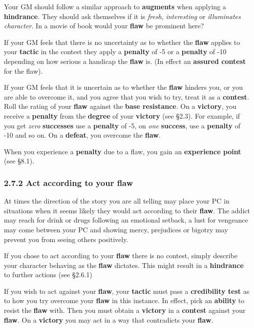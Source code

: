 \documentclass[
  11pt,
]{article}
\begin{document}
Your GM should follow a similar approach to \textbf{augments} when
applying a \textbf{hindrance}. They should ask themselves if it is
\emph{fresh}, \emph{interesting} or \emph{illuminates character}. In a
movie of book would your \textbf{flaw} be prominent here?

If your GM feels that there is no uncertainty as to whether the
\textbf{flaw} applies to your \textbf{tactic} in the contest they apply
a \textbf{penalty} of -5 or a \textbf{penalty} of -10 depending on how
serious a handicap the \textbf{flaw} is. (In effect an \textbf{assured
contest} for the flaw).

If your GM feels that it is uncertain as to whether the \textbf{flaw}
hinders you, or you are able to overcome it, and you agree that you wish
to try, treat it as a \textbf{contest}. Roll the rating of your
\textbf{flaw} against the \textbf{base resistance}. On a
\textbf{victory}, you receive a \textbf{penalty} from the
\textbf{degree} of your \textbf{victory} (see §2.3). For example, if you
get \emph{zero} \textbf{successes} use a \textbf{penalty} of -5, on
\emph{one} \textbf{success}, use a \textbf{penalty} of -10 and so on. On
a \textbf{defeat}, you overcome the \textbf{flaw}.

When you experience a \textbf{penalty} due to a flaw, you gain an
\textbf{experience point} (see §8.1).

\hypertarget{act-according-to-your-flaw}{%
\subsubsection{2.7.2 Act according to your
flaw}\label{act-according-to-your-flaw}}

At times the direction of the story you are all telling may place your
PC in situations when it seems likely they would act according to their
\textbf{flaw}. The addict may reach for drink or drugs following an
emotional setback, a lust for vengeance may come between your PC and
showing mercy, prejudices or bigotry may prevent you from seeing others
positively.

If you chose to act according to your \textbf{flaw} there is no contest,
simply describe your character behaving as the \textbf{flaw} dictates.
This might result in a \textbf{hindrance} to further actions (see
§2.6.1)

If you wish to act against your \textbf{flaw}, your \textbf{tactic} must
pass a \textbf{credibility test} as to how you try overcome your
\textbf{flaw} in this instance. In effect, pick an \textbf{ability} to
resist the \textbf{flaw} with. Then you must obtain a \textbf{victory}
in a \textbf{contest} against your \textbf{flaw}. On a \textbf{victory}
you may act in a way that contradicts your \textbf{flaw}.
\end{document}
